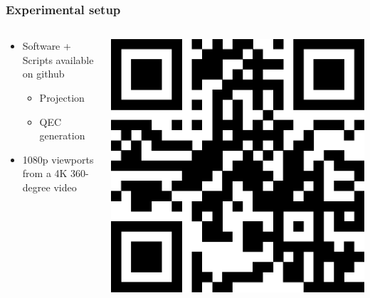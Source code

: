 \begin{frame}[c]
   \frametitle{Experimental setup}

   \begin{columns}[T]
     \begin{column}{0.65\linewidth}
        \begin{itemize}[<+->]
           \vfill
            \item Software + Scripts available on github
            \begin{itemize}[<.->]
               \item Projection
               \item QEC generation
            \end{itemize}
            \vfill
            \item 1080p viewports from a 4K 360-degree video
         \end{itemize}
      \end{column}
      \begin{column}{0.35\linewidth}
         \includegraphics[scale=0.25]{plots/pictures/Xavier/githubQRC.eps}
      \end{column}
   \end{columns}

\end{frame}

